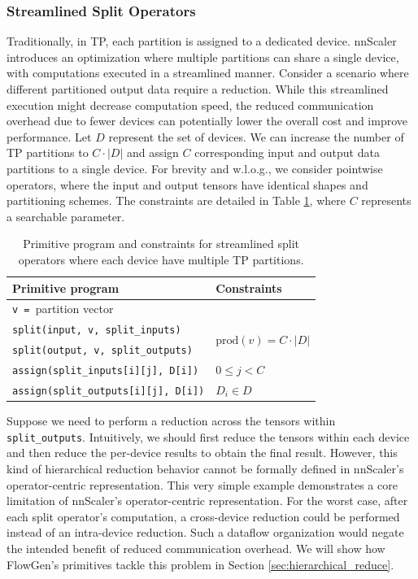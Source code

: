 \subsubsection{Streamlined Split Operators}
\label{sec:streamline}

Traditionally, in TP, each partition is assigned to a dedicated device. nnScaler\cite{lin2024nnscaler} introduces an optimization where multiple partitions can share a single device, with computations executed in a streamlined manner. Consider a scenario where different partitioned output data require a reduction. While this streamlined execution might decrease computation speed, the reduced communication overhead due to fewer devices can potentially lower the overall cost and improve performance. Let $D$ represent the set of devices. We can increase the number of TP partitions to $C \cdot |D|$ and assign $C$ corresponding input and output data partitions to a single device. For brevity and w.l.o.g., we consider pointwise operators, where the input and output tensors have identical shapes and partitioning schemes. The constraints are detailed in Table \ref{tab:streamline}, where $C$ represents a searchable parameter.

\begin{table}[h]
\centering
\footnotesize
\begin{tabular}{l|l}
\textbf{Primitive program} & \textbf{Constraints} \\
\hline
\texttt{v = }partition vector & \\
\hline
\texttt{split(input, v, split\_inputs)} & \multirow{2}{*}{$\mathrm{prod}(v) = C \cdot |D|$} \\
\texttt{split(output, v, split\_outputs)} &  \\
\hline
\texttt{assign(split\_inputs[i][j], D[i])} &  $0 \leq j < C$ \\
\texttt{assign(split\_outputs[i][j], D[i])} &  $D_i \in D$ \\
\hline
\end{tabular}
\caption{Primitive program and constraints for streamlined split operators where each device have multiple TP partitions.}
\label{tab:streamline}
\end{table}

Suppose we need to perform a reduction across the tensors within \texttt{split\_outputs}. Intuitively, we should first reduce the tensors within each device and then reduce the per-device results to obtain the final result. However, this kind of hierarchical reduction behavior cannot be formally defined in nnScaler's operator-centric representation. This very simple example demonstrates a core limitation of nnScaler's operator-centric representation. For the worst case, after each split operator's computation, a cross-device reduction could be performed instead of an intra-device reduction. Such a dataflow organization would negate the intended benefit of reduced communication overhead. We will show how FlowGen's primitives tackle this problem in Section \ref{sec:hierarchical_reduce}.


